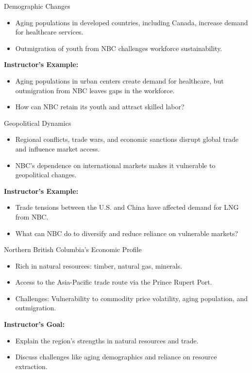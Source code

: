 \documentclass{beamer}
\begin{document}
\begin{frame}{Demographic Changes}
    \begin{itemize}
        \item Aging populations in developed countries, including Canada, increase demand for healthcare services.
        \item Outmigration of youth from NBC challenges workforce sustainability.
    \end{itemize}
    \textbf{Instructor’s Example:}
    \begin{itemize}
        \item Aging populations in urban centers create demand for healthcare, but outmigration from NBC leaves gaps in the workforce.
        \item How can NBC retain its youth and attract skilled labor?
    \end{itemize}
\end{frame}

\begin{frame}{Geopolitical Dynamics}
    \begin{itemize}
        \item Regional conflicts, trade wars, and economic sanctions disrupt global trade and influence market access.
        \item NBC’s dependence on international markets makes it vulnerable to geopolitical changes.
    \end{itemize}
    \textbf{Instructor’s Example:}
    \begin{itemize}
        \item Trade tensions between the U.S. and China have affected demand for LNG from NBC.
        \item What can NBC do to diversify and reduce reliance on vulnerable markets?
    \end{itemize}
\end{frame}

\begin{frame}{Northern British Columbia’s Economic Profile}
    \begin{itemize}
        \item Rich in natural resources: timber, natural gas, minerals.
        \item Access to the Asia-Pacific trade route via the Prince Rupert Port.
        \item Challenges: Vulnerability to commodity price volatility, aging population, and outmigration.
    \end{itemize}
    \textbf{Instructor’s Goal:}
    \begin{itemize}
        \item Explain the region’s strengths in natural resources and trade.
        \item Discuss challenges like aging demographics and reliance on resource extraction.
    \end{itemize}
\end{frame}
\end{document}
